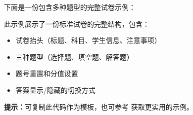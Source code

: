 下面是一份包含多种题型的完整试卷示例：

\begin{tcolorbox}[colback=green!5!white, colframe=green!75!black, title=\textbf{完整示例说明}]
此示例展示了一份标准试卷的完整结构，包含：
\begin{itemize}
  \item 试卷抬头（标题、科目、学生信息、注意事项）
  \item 三种题型（选择题、填空题、解答题）
  \item 题号重置和分值设置
  \item 答案显示/隐藏的切换方式
\end{itemize}

\textbf{提示：}可复制此代码作为模板，也可参考  获取更实用的示例。
\end{tcolorbox}

